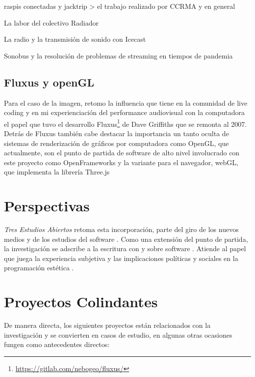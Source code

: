 raspis conectadas y jacktrip > el trabajo realizado por CCRMA y en general 

La labor del colectivo Radiador

La radio y la transmisión de sonido con Icecast 

Sonobus y la resolución de problemas de streaming en tiempos de pandemia 

\subsection{Fluxus y openGL}

Para el caso de la imagen, retomo la influencia que tiene en la comunidad de live coding y en mi experienciación del performance audiovisual con la computadora el papel que tuvo el desarrollo Fluxus\footnote{\url{https://gitlab.com/nebogeo/fluxus/}} de Dave Griffiths que se remonta al 2007. Detrás de Fluxus también cabe destacar la importancia un tanto oculta de sistemas de renderización de gráficos por computadora como OpenGL, que actualmente, son el punto de partida de software de alto nivel involucrado con este proyecto como OpenFrameworks y la variante para el navegador, webGL, que implementa la librería Three.js 

\section{Perspectivas}

\textit{Tres Estudios Abiertos} retoma esta incorporación, parte del giro de los nuevos medios y de los estudios del software \citep{manovichlanguage}. Como una extensión del punto de partida, la investigación se adscribe a la escritura con y sobre software \citep{aestheticProgramming}. Atiende al papel que juega la experiencia subjetiva y las implicaciones políticas y sociales en la programación estética \citep{speakingCode}. 


\section{Proyectos Colindantes}

De manera directa, los siguientes proyectos están relacionados con la investigación y se convierten en casos de estudio, en algunas otras ocasiones fungen como antecedentes directos:

